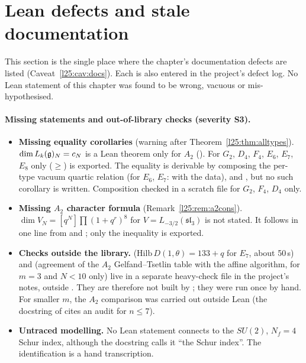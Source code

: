 \section{Lean defects and stale documentation}\label{l25:sec:defects}

This section is the single place where the chapter's documentation defects are listed (Caveat~\ref{l25:cav:docs}).
Each is also entered in the project's defect log. No Lean statement of this chapter was found to be wrong, vacuous or
mis-hypothesised.

\paragraph{Missing statements and out-of-library checks (severity S3).}
\begin{itemize}
\item \textbf{Missing equality corollaries} (warning after Theorem~\ref{l25:thm:alltypes}). $\dim L_k(\mathfrak g)_N=c_N$
  is a Lean theorem only for $A_2$ (). For $G_2$, $D_4$, $F_4$, $E_6$, $E_7$, $E_8$ only
   ($\ge$) is exported. The equality is derivable by composing the per-type vacuum quartic
  relation (for $E_6$, $E_7$:  with the  data),
   and , but no such corollary is
  written. Composition checked in a scratch file for $G_2$, $F_4$, $D_4$ only.
\item \textbf{Missing $A_2$ character formula} (Remark~\ref{l25:rem:a2cons}). $\dim V_N=[q^N]\prod(1+q^r)^8$ for
  $V=L_{-3/2}(\mathfrak{sl}_3)$ is not stated. It follows in one line from  and
  ; only the inequality  is exported.
\item \textbf{Checks outside the library.}  ($\mathrm{Hilb}\,D(1,\theta)=133+q$ for $E_7$, about
  50\,s) and  (agreement of the $A_2$ Gelfand--Tsetlin table with the affine algorithm, for
  $m=3$ and $N<10$ only) live in a separate heavy-check file in the project's notes, outside . They are
  therefore not built by ; they were run once by hand. For smaller $m$, the $A_2$ comparison was
  carried out outside Lean (the docstring of  cites an audit for $n\le7$).
\item \textbf{Untraced modelling.} No Lean statement connects  to the $SU(2)$, $N_f=4$ Schur index,
  although the docstring calls it ``the Schur index''. The identification is a hand transcription.
\end{itemize}

